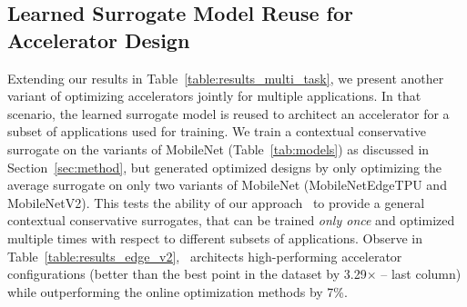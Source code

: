 \subsection{Learned Surrogate Model Reuse for Accelerator Design}
\label{app:additional_experiments_multi}
%
Extending our results in Table~\ref{table:results_multi_task}, we present another variant of optimizing accelerators jointly for multiple applications.
%
In that scenario, the learned surrogate model is reused to architect an accelerator for a subset of applications used for training.
%
We train a contextual conservative surrogate on the variants of MobileNet (Table~\ref{tab:models}) as discussed in Section~\ref{sec:method}, but generated optimized designs by only optimizing the average surrogate on only two variants of MobileNet (MobileNetEdgeTPU and MobileNetV2). 
%
This tests the ability of our approach \primemethodname\ to provide a general contextual conservative surrogates, that can be trained \textit{only once} and optimized multiple times with respect to different subsets of applications.  
%
Observe in Table~\ref{table:results_edge_v2}, \primemethodname\ architects high-performing accelerator configurations (better than the best point in the dataset by 3.29$\times$ -- last column) while outperforming the online optimization methods by 7\%.
%
\begin{table}[t!]
\small
\renewcommand{\arraystretch}{1.2}
\centering
\caption{Optimized objective values (i.e., latency in milliseconds) obtained by our \primemethodname\ when using the jointly optimized model on three variants of MobileNets and use for MobileNetEdgeTPU and MobileNetV2 for different dataset configurations. \primemethodname\ outperforms the best online method by \textbf{7\%} and finds an accelerator that is \textbf{3.29$\times$} better than the best accelerator in the training dataset (last row). The best accelerator configuration is highlighted in bold.}
\label{table:results_edge_v2}
\end{table}
%
